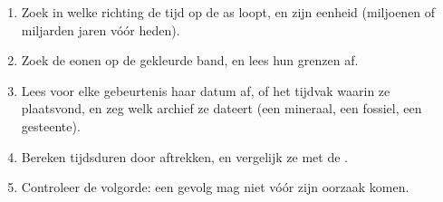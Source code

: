 \begin{method}\label{met:g12:early-earth:timeline}
\begin{enumerate}
  \item Zoek in welke richting de tijd op de as loopt, en zijn eenheid (miljoenen of
        miljarden jaren vóór heden).
  \item Zoek de eonen op de gekleurde band, en lees hun grenzen af.
  \item Lees voor elke gebeurtenis haar datum af, of het tijdvak waarin ze
        plaatsvond, en zeg welk archief ze dateert (een mineraal, een fossiel, een gesteente).
  \item Bereken tijdsduren door aftrekken, en vergelijk ze met de .
  \item Controleer de volgorde: een gevolg mag niet vóór zijn oorzaak komen.
\end{enumerate}
\end{method}

